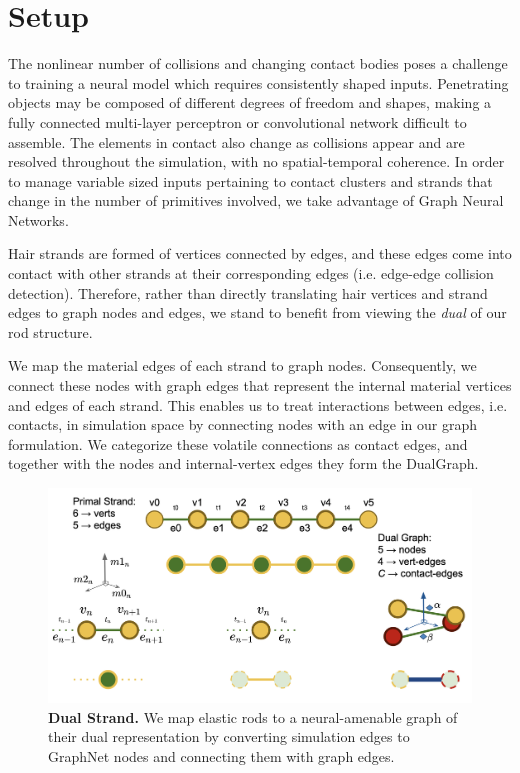 \documentclass[12pt]{report}
\newcommand{\hn}{DualGraph}
\begin{document}
\section{Setup}\label{sec:hair_exp}
The nonlinear number of collisions and changing contact bodies poses a challenge
to training a neural model which requires consistently shaped inputs.
Penetrating objects may be composed of different degrees of freedom and shapes,
making a fully connected multi-layer perceptron or convolutional network difficult
to assemble.
The elements in contact also change as collisions appear and are resolved throughout the simulation,
with no spatial-temporal coherence.
In order to manage variable sized inputs pertaining to contact clusters and strands
that change in the number of primitives involved, 
we take advantage of Graph Neural Networks.

Hair strands are formed of vertices connected by edges, and these
edges come into contact with other strands at their corresponding edges 
(i.e. edge-edge collision detection).
Therefore, rather than directly translating hair vertices and strand edges
to graph nodes and edges, we stand to benefit from viewing the \emph{dual} of
our rod structure.

We map the material edges of each strand to graph nodes.
Consequently, we connect these nodes with graph edges that represent the
internal material vertices and edges of each strand.
This enables us to treat interactions between edges, i.e. contacts,
in simulation space by connecting nodes with an edge in our graph formulation.
We categorize these volatile connections as contact edges, and together
with the nodes and internal-vertex edges they form the \hn.

\begin{figure}[H]
    \centering
    \includegraphics[width=0.95\linewidth]{figs/dualStrand.png}
    \caption{\textbf{Dual Strand.}
    We map elastic rods to a neural-amenable graph of their dual representation 
    by converting simulation edges to GraphNet nodes and connecting them with graph edges.
    \label{fig:dual_strand}}
\end{figure}
\end{document}
